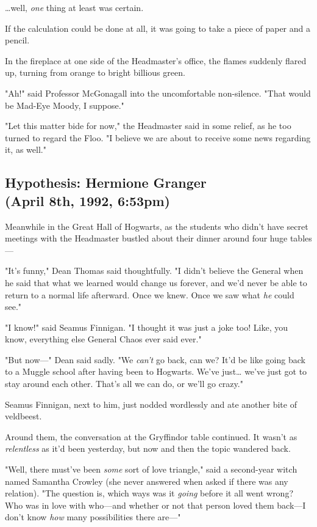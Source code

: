 {\ldots}well, \emph{one} thing at least was certain.

If the calculation could be done at all, it was going to take a piece of paper 
and a pencil.

In the fireplace at one side of the Headmaster's office, the flames suddenly 
flared up, turning from orange to bright billious green.

"Ah!" said Professor McGonagall into the uncomfortable non-silence. "That would 
be Mad-Eye Moody, I suppose."

"Let this matter bide for now," the Headmaster said in some relief, as he too 
turned to regard the Floo. "I believe we are about to receive some news 
regarding it, as well."
\sbreak
\subsection{Hypothesis: Hermione Granger\\
(April 8th, 1992, 6:53pm)}

Meanwhile in the Great Hall of Hogwarts, as the students who didn't have secret 
meetings with the Headmaster bustled about their dinner around four huge 
tables---

"It's funny," Dean Thomas said thoughtfully. "I didn't believe the General when 
he said that what we learned would change us forever, and we'd never be able to 
return to a normal life afterward. Once we knew. Once we saw what \emph{he} 
could see."

"I know!" said Seamus Finnigan. "I thought it was just a joke too! Like, you 
know, everything else General Chaos ever said ever."

"But now---" Dean said sadly. "We \emph{can't} go back, can we? It'd be like 
going back to a Muggle school after having been to Hogwarts. We've just{\ldots} 
we've just got to stay around each other. That's all we can do, or we'll go 
crazy."

Seamus Finnigan, next to him, just nodded wordlessly and ate another bite of 
veldbeest.

Around them, the conversation at the Gryffindor table continued. It wasn't as 
\emph{relentless} as it'd been yesterday, but now and then the topic wandered 
back.

"Well, there must've been \emph{some} sort of love triangle," said a 
second-year witch named Samantha Crowley (she never answered when asked if 
there was any relation). "The question is, which ways was it \emph{going} 
before it all went wrong? Who was in love with who---and whether or not that 
person loved them back---I don't know \emph{how} many possibilities there 
are---"

